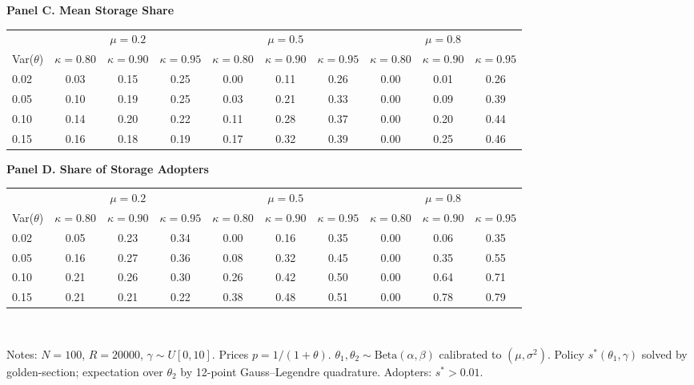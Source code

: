 \begin{table}[ht!]
\begin{threeparttable}
\vspace{0.35em}
\noindent\textbf{Panel C. Mean Storage Share}
\vspace{0.25em}
\begin{tabular}{l|ccc|ccc|ccc}
\toprule
 & \multicolumn{3}{c|}{$\mu=0.2$} & \multicolumn{3}{c|}{$\mu=0.5$} & \multicolumn{3}{c}{$\mu=0.8$} \\
Var($\theta$) & $\kappa=0.80$ & $\kappa=0.90$ & $\kappa=0.95$ & $\kappa=0.80$ & $\kappa=0.90$ & $\kappa=0.95$ & $\kappa=0.80$ & $\kappa=0.90$ & $\kappa=0.95$ \\
\midrule
0.02 & 0.03 & 0.15 & 0.25 & 0.00 & 0.11 & 0.26 & 0.00 & 0.01 & 0.26 \\
0.05 & 0.10 & 0.19 & 0.25 & 0.03 & 0.21 & 0.33 & 0.00 & 0.09 & 0.39 \\
0.10 & 0.14 & 0.20 & 0.22 & 0.11 & 0.28 & 0.37 & 0.00 & 0.20 & 0.44 \\
0.15 & 0.16 & 0.18 & 0.19 & 0.17 & 0.32 & 0.39 & 0.00 & 0.25 & 0.46 \\
\bottomrule
\end{tabular}

\vspace{0.35em}
\noindent\textbf{Panel D. Share of Storage Adopters}
\vspace{0.25em}
\begin{tabular}{l|ccc|ccc|ccc}
\toprule
 & \multicolumn{3}{c|}{$\mu=0.2$} & \multicolumn{3}{c|}{$\mu=0.5$} & \multicolumn{3}{c}{$\mu=0.8$} \\
Var($\theta$) & $\kappa=0.80$ & $\kappa=0.90$ & $\kappa=0.95$ & $\kappa=0.80$ & $\kappa=0.90$ & $\kappa=0.95$ & $\kappa=0.80$ & $\kappa=0.90$ & $\kappa=0.95$ \\
\midrule
0.02 & 0.05 & 0.23 & 0.34 & 0.00 & 0.16 & 0.35 & 0.00 & 0.06 & 0.35 \\
0.05 & 0.16 & 0.27 & 0.36 & 0.08 & 0.32 & 0.45 & 0.00 & 0.35 & 0.55 \\
0.10 & 0.21 & 0.26 & 0.30 & 0.26 & 0.42 & 0.50 & 0.00 & 0.64 & 0.71 \\
0.15 & 0.21 & 0.21 & 0.22 & 0.38 & 0.48 & 0.51 & 0.00 & 0.78 & 0.79 \\
\bottomrule
\end{tabular}
\
\begin{tablenotes}[flushleft]
\footnotesize
\item Notes: $N=100$, $R=20000$, $\gamma\sim U[0,10]$. Prices $p=1/(1+\theta)$. $\theta_1,\theta_2\sim \text{Beta}(\alpha,\beta)$ calibrated to $(\mu,\sigma^2)$. Policy $s^*(\theta_1,\gamma)$ solved by golden-section; expectation over $\theta_2$ by 12-point Gauss–Legendre quadrature. Adopters: $s^*>0.01$.
\end{tablenotes}
\end{threeparttable}
\end{table}
